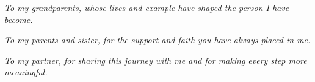 \thispagestyle{empty}
\vspace*{\fill}
\begin{center}

    \textit{To my grandparents, whose lives and example have shaped the person I have become.}

    \textit{To my parents and sister, for the support and faith you have always placed in me.}

    \textit{To my partner, for sharing this journey with me and for making every step more meaningful.}

\end{center}
\vspace*{\fill}

\clearpage